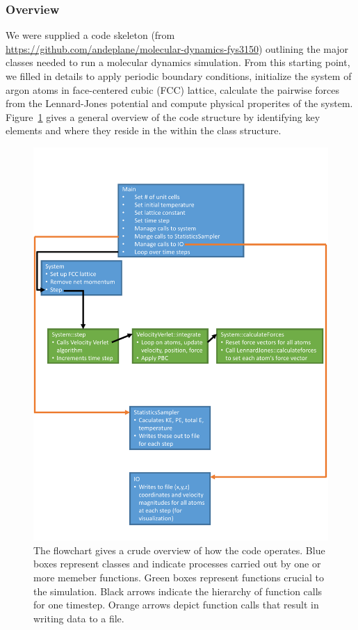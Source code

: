 \documentclass[10pt,showpacs,preprintnumbers,footinbib,amsmath,amssymb,aps,prl,twocolumn,groupedaddress,superscriptaddress,showkeys]{revtex4-1}
\begin{document}
\subsubsection*{Overview}

We were supplied a code skeleton (from
\url{ https://github.com/andeplane/molecular-dynamics-fys3150})
 outlining the major classes needed to run a molecular dynamics
simulation. From this starting point, we filled in details to apply
periodic boundary conditions, initialize the system of argon
atoms in face-centered cubic (FCC) lattice, calculate the pairwise
forces from the Lennard-Jones potential and compute physical
properites of the system. Figure~\ref{fig:flowchart} gives a
general overview of the code structure by identifying key
elements and where they reside in the within the class structure.

\begin{figure}
	\includegraphics[width=\textwidth]{figures/flowchart.pdf}
	\caption{The flowchart gives a crude overview of how the
	code operates. Blue boxes represent classes and
	indicate processes carried out by one or more memeber
	functions. Green boxes represent functions crucial to the 
	simulation. Black arrows indicate the hierarchy of function
	calls for one timestep. Orange arrows depict function
	calls that result in writing data to a file.}
	\label{fig:flowchart}
\end{figure}
	
\end{document}
